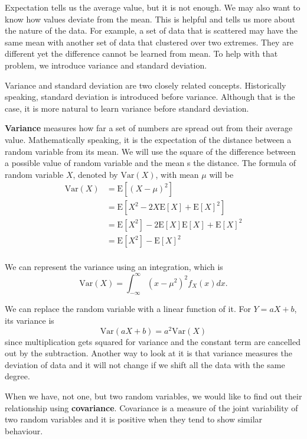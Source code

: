 \documentclass[11pt, a4paper, oneside]{book}
\theoremstyle{definition}
\newcommand{\var}[1]{\text{Var}(#1)}
\newcommand{\E}[1]{\text{E}[#1]}
\begin{document}
\noindent Expectation tells us the average value, but it is not enough. We may also want to know how values deviate from the mean. This is helpful and tells us more about the nature of the data. For example, a set of data that is scattered may have the same mean with another set of data that clustered over two extremes. They are different yet the difference cannot be learned from mean. To help with that problem, we introduce {variance} and {standard deviation}. 

\noindent Variance and standard deviation are two closely related concepts. Historically speaking, standard deviation is introduced before variance. Although that is the case, it is more natural to learn variance before standard deviation. 

\noindent \textbf{Variance} measures how far a set of numbers are spread out from their average value. Mathematically speaking, it is the expectation of the distance between a random variable from its mean. We will use the square of the difference between a possible value of random variable  and the mean s the distance. The formula of random variable $X$, denoted by $\var{X}$, with mean $\mu$ will be
\begin{equation*}
\begin{split}
\var{X} &= \E{(X - \mu)^2} \\
&= \E{X^2 - 2X\E{X} +\E{X}^2} \\
&= \E{X^2} -2\E{X}\E{X} +\E{X}^2 \\
&= \E{X^2} - \E{X}^2 \\
\end{split}
\end{equation*}

\noindent We can represent the variance using an integration, which is\[
\var{X} = \int_{-\infty}^{\infty}(x-\mu^2)^2f_X(x)dx.
\]

\noindent We can replace the random variable with a linear function of it. For $Y = aX + b$, its variance is\[
\var{aX+b} = a^2 \var{X}
\]
since multiplication gets squared for variance and the constant term are cancelled out by the subtraction. Another way to look at it is that variance measures the deviation of data and it will not change if we shift all the data with the same degree.

\noindent When we have, not one, but two random variables, we would like to find out their relationship using \textbf{covariance}. Covariance is a measure of the joint variability of two random variables and it is positive when they tend to show similar behaviour. 
\end{document}
